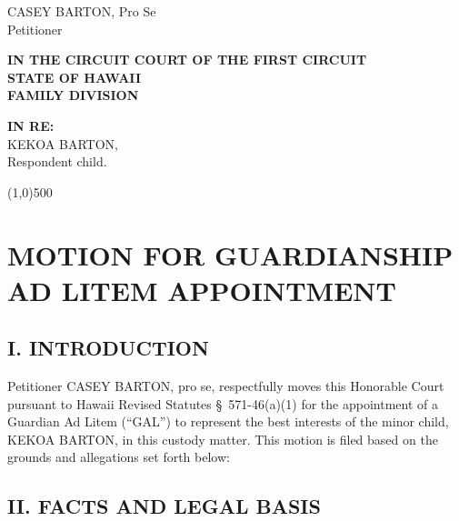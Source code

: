 \documentclass[11pt,letter]{article}
\begin{document}
\noindent
\begin{flushright}
CASEY BARTON, Pro Se \\  
Petitioner \\[0.3cm]
\end{flushright}

\begin{center}
\textbf{IN THE CIRCUIT COURT OF THE FIRST CIRCUIT} \\
\textbf{STATE OF HAWAII} \\
\textbf{FAMILY DIVISION}
\end{center}

\begin{flushleft}
\textbf{IN RE:} \\[0.2cm]
KEKOA BARTON, \\[0.2cm]
\hspace{1cm} Respondent child. 
\end{flushleft}

\vspace{0.5cm}
\line(1,0){500}
\vspace{0.5cm}

\section*{MOTION FOR GUARDIANSHIP AD LITEM APPOINTMENT}

\subsection*{I. INTRODUCTION}

Petitioner CASEY BARTON, pro se, respectfully moves this Honorable Court pursuant to Hawaii Revised Statutes \S~571-46(a)(1) for the appointment of a Guardian Ad Litem (``GAL'') to represent the best interests of the minor child, KEKOA BARTON, in this custody matter. This motion is filed based on the grounds and allegations set forth below:

\subsection*{II. FACTS AND LEGAL BASIS}
\end{document}
